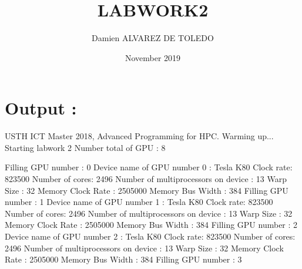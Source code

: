 \documentclass{article}
\title{LABWORK2}
\author{Damien ALVAREZ DE TOLEDO }
\date{November 2019}
\begin{document}
\maketitle

\section{Output :}

USTH ICT Master 2018, Advanced Programming for HPC. \newline
Warming up... \newline
Starting labwork 2 \newline
Number total of GPU : 8 \newline

Filling GPU number : 0 \newline
Device name of GPU number 0 : Tesla K80 \newline
Clock rate: 823500 \newline
Number of cores: 2496 \newline
Number of multiprocessors on device : 13 \newline
Warp Size : 32 \newline
Memory Clock Rate : 2505000 \newline
Memory Bus Width : 384 \newline
Filling GPU number : 1 \newline
Device name of GPU number 1 : Tesla K80 \newline
Clock rate: 823500 \newline
Number of cores: 2496 \newline
Number of multiprocessors on device : 13 \newline
Warp Size : 32 \newline
Memory Clock Rate : 2505000 \newline
Memory Bus Width : 384 \newline
Filling GPU number : 2 \newline
Device name of GPU number 2 : Tesla K80 \newline
Clock rate: 823500 \newline
Number of cores: 2496 \newline
Number of multiprocessors on device : 13 \newline
Warp Size : 32 \newline
Memory Clock Rate : 2505000 \newline
Memory Bus Width : 384 \newline
Filling GPU number : 3 \newline
\end{document}
